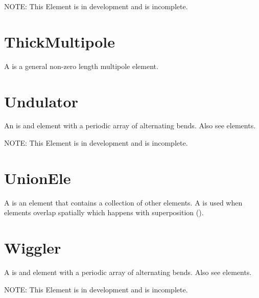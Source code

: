 NOTE: This Element is in development and is incomplete.

\section{ThickMultipole}
\label{s:thickmult}

A  is a general non-zero length multipole element.

\section{Undulator}
\label{s:undulator}

An  is and element with a periodic array of alternating bends.
Also see  elements.

NOTE: This Element is in development and is incomplete.

\section{UnionEle}
\label{s:unionele}

A  is an element that contains a collection of other elements.
A  is used when elements overlap spatially which happens with superposition ().

\section{Wiggler}
\label{s:wiggler}

A  is and element with a periodic array of alternating bends.
Also see  elements.

NOTE: This Element is in development and is incomplete.
